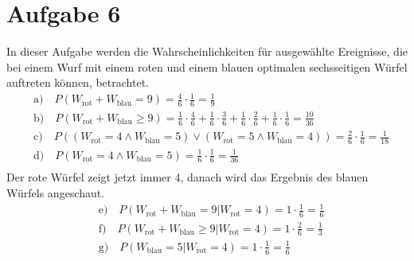 \documentclass[a4paper, 11pt]{article}
\begin{document}
\section*{Aufgabe 6}
In dieser Aufgabe werden die Wahrscheinlichkeiten für ausgewählte Ereignisse, die
bei einem Wurf mit einem roten und einem blauen optimalen sechsseitigen Würfel
auftreten können, betrachtet.
\begin{align*}
  &\text{a)} \quad
  P(W_\text{rot}+W_\text{blau}=9) = \frac{4}{6} \cdot \frac{1}{6} = \frac{1}{9} \\
  &\text{b)} \quad
  P(W_\text{rot}+W_\text{blau}\ge9) = \frac{1}{6} \cdot \frac{4}{6}
    +\frac{1}{6} \cdot \frac{3}{6} + \frac{1}{6} \cdot \frac{2}{6}
    +\frac{1}{6} \cdot \frac{1}{6} = \frac{10}{36} \\
  &\text{c)} \quad
  P((W_\text{rot}=4 \land W_\text{blau}=5) \lor (W_\text{rot}=5 \land W_\text{blau}=4))
    = \frac{2}{6} \cdot \frac{1}{6} = \frac{1}{18}\\
  &\text{d)} \quad
  P(W_\text{rot}=4 \land W_\text{blau}=5) = \frac{1}{6} \cdot \frac{1}{6}
    = \frac{1}{36}\\
\end{align*}
Der rote Würfel zeigt jetzt immer 4, danach wird das Ergebnis des blauen Würfels
angeschaut.
\begin{align*}
  &\text{e)} \quad
  P(W_\text{rot}+W_\text{blau}=9 | W_\text{rot}=4) = 1 \cdot \frac{1}{6} = \frac{1}{6}\\
  &\text{f)} \quad
  P(W_\text{rot}+W_\text{blau}\ge9 | W_\text{rot}=4) = 1 \cdot \frac{2}{6} = \frac{1}{3}\\
  &\text{g)} \quad
  P(W_\text{blau}=5 | W_\text{rot}=4) = 1 \cdot \frac{1}{6} = \frac{1}{6}
\end{align*}
\end{document}
